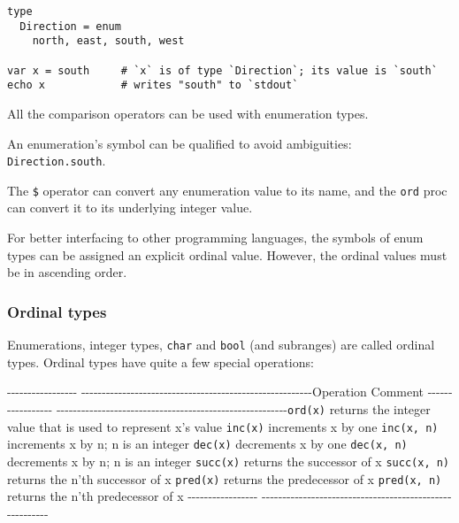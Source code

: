 \begin{verbatim}
type
  Direction = enum
    north, east, south, west

var x = south     # `x` is of type `Direction`; its value is `south`
echo x            # writes "south" to `stdout`
\end{verbatim}

All the comparison operators can be used with enumeration types.

An enumeration's symbol can be qualified to avoid ambiguities:
\texttt{Direction.south}.

The \texttt{\$} operator can convert any enumeration value to its name,
and the \texttt{ord} proc can convert it to its underlying integer
value.

For better interfacing to other programming languages, the symbols of
enum types can be assigned an explicit ordinal value. However, the
ordinal values must be in ascending order.

\hypertarget{ordinal-types}{%
\subsubsection{Ordinal types}\label{ordinal-types}}

Enumerations, integer types, \texttt{char} and \texttt{bool} (and
subranges) are called ordinal types. Ordinal types have quite a few
special operations:

-\/-\/-\/-\/-\/-\/-\/-\/-\/-\/-\/-\/-\/-\/-\/-\/-
-\/-\/-\/-\/-\/-\/-\/-\/-\/-\/-\/-\/-\/-\/-\/-\/-\/-\/-\/-\/-\/-\/-\/-\/-\/-\/-\/-\/-\/-\/-\/-\/-\/-\/-\/-\/-\/-\/-\/-\/-\/-\/-\/-\/-\/-\/-\/-\/-\/-\/-\/-\/-\/-\/-\/-Operation
Comment -\/-\/-\/-\/-\/-\/-\/-\/-\/-\/-\/-\/-\/-\/-\/-\/-
-\/-\/-\/-\/-\/-\/-\/-\/-\/-\/-\/-\/-\/-\/-\/-\/-\/-\/-\/-\/-\/-\/-\/-\/-\/-\/-\/-\/-\/-\/-\/-\/-\/-\/-\/-\/-\/-\/-\/-\/-\/-\/-\/-\/-\/-\/-\/-\/-\/-\/-\/-\/-\/-\/-\/-\texttt{ord(x)}
returns the integer value that is used to represent {x}'s value
\texttt{inc(x)} increments {x} by one \texttt{inc(x,\ n)} increments {x}
by {n}; {n} is an integer \texttt{dec(x)} decrements {x} by one
\texttt{dec(x,\ n)} decrements {x} by {n}; {n} is an integer
\texttt{succ(x)} returns the successor of {x} \texttt{succ(x,\ n)}
returns the {n}'th successor of {x} \texttt{pred(x)} returns the
predecessor of {x} \texttt{pred(x,\ n)} returns the {n}'th predecessor
of {x} -\/-\/-\/-\/-\/-\/-\/-\/-\/-\/-\/-\/-\/-\/-\/-\/-
-\/-\/-\/-\/-\/-\/-\/-\/-\/-\/-\/-\/-\/-\/-\/-\/-\/-\/-\/-\/-\/-\/-\/-\/-\/-\/-\/-\/-\/-\/-\/-\/-\/-\/-\/-\/-\/-\/-\/-\/-\/-\/-\/-\/-\/-\/-\/-\/-\/-\/-\/-\/-\/-\/-\/-

